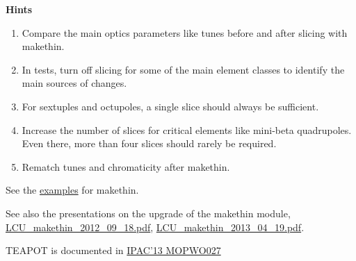{\bf Hints}\\
\begin{enumerate}
\item Compare the main optics parameters like tunes before and after slicing
with makethin. 
\item In tests, turn off slicing for some of the main element classes to
identify the main sources of changes. 
\item For sextuples and octupoles, a single slice should always be sufficient.
\item Increase the number of slices for critical elements like mini-beta
quadrupoles. Even there, more than four slices should rarely be
required. 
\item Rematch tunes and chromaticity after makethin. 
\end{enumerate}


See the
\href{http://madx.web.cern.ch/madx/madX/examples/makethin/}{examples}
for makethin.

See also the presentations on the upgrade of the makethin module,\\
\href{http://ab-dep-abp.web.cern.ch/ab-dep-abp/LCU/LCU_meetings/2012/20120918/LCU_makethin_2012_09_18.pdf}{LCU\_makethin\_2012\_09\_18.pdf}, 
\hspace{0.2cm} 
\href{http://ab-dep-abp.web.cern.ch/ab-dep-abp/LCU/LCU_meetings/2013/20130419/LCU_makethin_2013_04_19.pdf}{LCU\_makethin\_2013\_04\_19.pdf}.
 

TEAPOT is documented in \href{http://accelconf.web.cern.ch/AccelConf/IPAC2013/papers/mopwo027.pdf}{IPAC'13 MOPWO027}











